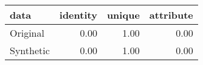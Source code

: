 \begin{tabular}{lrrr}
  \toprule
data & identity & unique & attribute \\ 
  \midrule
Original & 0.00 & 1.00 & 0.00 \\ 
  Synthetic & 0.00 & 1.00 & 0.00 \\ 
   \bottomrule
\end{tabular}
